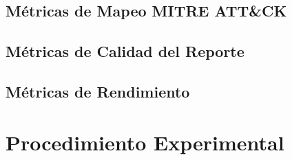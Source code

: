 \subsection{Métricas de Mapeo MITRE ATT\&CK}

\subsection{Métricas de Calidad del Reporte}

\subsection{Métricas de Rendimiento}

\section{Procedimiento Experimental}
